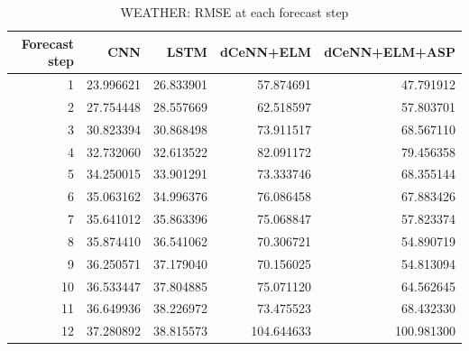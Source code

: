 \begin{table}
\caption{WEATHER: RMSE at each forecast step}
\begin{tabular}{rrrrr}
\toprule
Forecast step & CNN & LSTM & dCeNN+ELM & dCeNN+ELM+ASP \\
\midrule
1 & 23.996621 & 26.833901 & 57.874691 & 47.791912 \\
2 & 27.754448 & 28.557669 & 62.518597 & 57.803701 \\
3 & 30.823394 & 30.868498 & 73.911517 & 68.567110 \\
4 & 32.732060 & 32.613522 & 82.091172 & 79.456358 \\
5 & 34.250015 & 33.901291 & 73.333746 & 68.355144 \\
6 & 35.063162 & 34.996376 & 76.086458 & 67.883426 \\
7 & 35.641012 & 35.863396 & 75.068847 & 57.823374 \\
8 & 35.874410 & 36.541062 & 70.306721 & 54.890719 \\
9 & 36.250571 & 37.179040 & 70.156025 & 54.813094 \\
10 & 36.533447 & 37.804885 & 75.071120 & 64.562645 \\
11 & 36.649936 & 38.226972 & 73.475523 & 68.432330 \\
12 & 37.280892 & 38.815573 & 104.644633 & 100.981300 \\
\bottomrule
\end{tabular}
\end{table}

